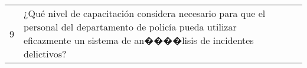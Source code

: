\begin{longtable}{|l|p{5.9cm}|p{4cm}|p{4cm}|}
    9                                        & ¿Qué nivel de capacitación considera necesario para que el personal del departamento de policía pueda utilizar eficazmente un sistema de an����lisis de incidentes delictivos?                                                                          &                                         &                                           \\
\end{longtable}
